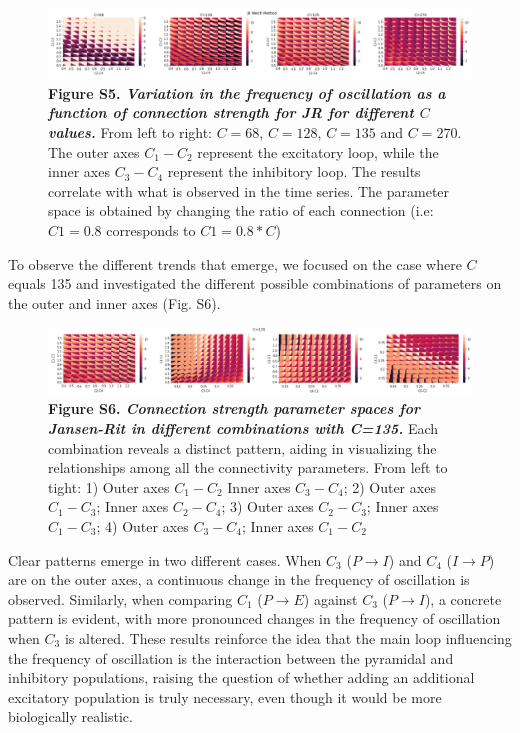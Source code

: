 \documentclass[12pt,twoside]{article}
\begin{document}
\begin{figure}[H]
    \hspace{-1cm}
    \includegraphics[scale=0.60]{Images/JR_Connection_2png_new.png}
    \caption*{\textbf{Figure S5.  \textit{Variation in  the frequency of oscillation as a function of connection strength for JR for different $C$ values.}} From left to right: $C=68$, $C=128$, $C=135$ and $C=270$. The outer axes $C_{1}-C_{2}$ represent the excitatory loop, while the inner axes $C_{3}-C_{4}$ represent the inhibitory loop. The results correlate with what is observed in the time series. The parameter space is obtained by changing the ratio of each connection (i.e: $C1 = 0.8$ corresponds to $C1 = 0.8*C$)}       
    \label{fig:JR_Cconnection}
\end{figure}

To observe the different trends that emerge, we focused on the case where $C$ equals 135 and investigated the different possible combinations of parameters on the outer and inner axes (Fig. S6).

\begin{figure}[H]
    \hspace{-1.3cm}
    \includegraphics[scale=0.58]{Images/JR_All_Config_new.png}
    \caption*{\textbf{Figure S6.  \textit{Connection strength parameter spaces for Jansen-Rit in different combinations with C=135.}} Each combination reveals a distinct pattern, aiding in visualizing the relationships among all the connectivity parameters. From left to tight: 1) Outer axes $C_{1}-C_{2}$ Inner axes $C_{3}-C_{4}$; 2) Outer axes $C_{1}-C_{3}$; Inner axes $C_{2}-C_{4}$; 3)  Outer axes $C_{2}-C_{3}$; Inner axes $C_{1}-C_{3}$; 4) Outer axes $C_{3}-C_{4}$; Inner axes $C_{1}-C_{2}$}            
    \label{fig:JR_C135}
\end{figure}

Clear patterns emerge in two different cases. When $C_{3}$ ($P \rightarrow I$) and $C_{4}$ ($I \rightarrow P$) are on the outer axes, a continuous change in the frequency of oscillation is observed. Similarly, when comparing $C_{1}$ ($P \rightarrow E$) against $C_{3}$ ($P \rightarrow I$), a concrete pattern is evident, with more pronounced changes in the frequency of oscillation when $C_{3}$ is altered. These results reinforce the idea that the main loop influencing the frequency of oscillation is the interaction between the pyramidal and inhibitory populations, raising the question of whether adding an additional excitatory population is truly necessary, even though it would be more biologically realistic. 
\end{document}
